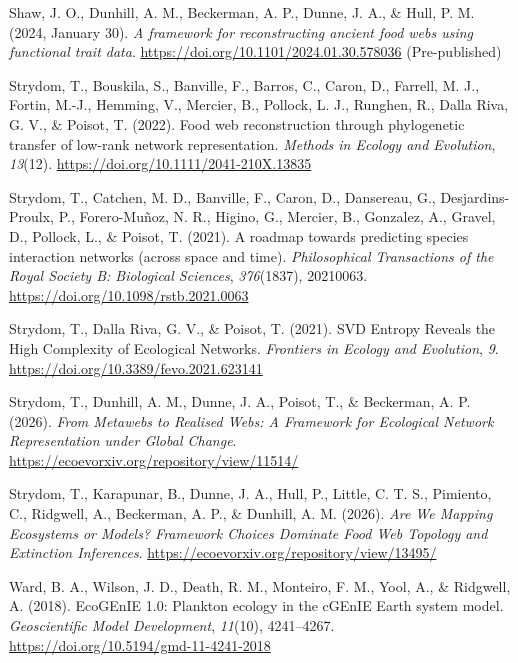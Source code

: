 \documentclass[
]{article}
\newlength{\cslhangindent}
\newenvironment{CSLReferences}[2] %
 {\begin{list}{}{%
  \setlength{\itemindent}{0pt}
  \setlength{\leftmargin}{0pt}
  \setlength{\parsep}{0pt}
  \ifodd #1
   \setlength{\leftmargin}{\cslhangindent}
   \setlength{\itemindent}{-1\cslhangindent}
  \fi
  \setlength{\itemsep}{#2\baselineskip}}}
 {\end{list}}
\begin{document}
\begin{CSLReferences}{1}{0}
Shaw, J. O., Dunhill, A. M., Beckerman, A. P., Dunne, J. A., \& Hull, P.
M. (2024, January 30). \emph{A framework for reconstructing ancient food
webs using functional trait data}.
\url{https://doi.org/10.1101/2024.01.30.578036} (Pre-published)

Strydom, T., Bouskila, S., Banville, F., Barros, C., Caron, D., Farrell,
M. J., Fortin, M.-J., Hemming, V., Mercier, B., Pollock, L. J., Runghen,
R., Dalla Riva, G. V., \& Poisot, T. (2022). Food web reconstruction
through phylogenetic transfer of low-rank network representation.
\emph{Methods in Ecology and Evolution}, \emph{13}(12).
\url{https://doi.org/10.1111/2041-210X.13835}

Strydom, T., Catchen, M. D., Banville, F., Caron, D., Dansereau, G.,
Desjardins-Proulx, P., Forero-Muñoz, N. R., Higino, G., Mercier, B.,
Gonzalez, A., Gravel, D., Pollock, L., \& Poisot, T. (2021). A roadmap
towards predicting species interaction networks (across space and time).
\emph{Philosophical Transactions of the Royal Society B: Biological
Sciences}, \emph{376}(1837), 20210063.
\url{https://doi.org/10.1098/rstb.2021.0063}

Strydom, T., Dalla Riva, G. V., \& Poisot, T. (2021). {SVD Entropy
Reveals} the {High Complexity} of {Ecological Networks}. \emph{Frontiers
in Ecology and Evolution}, \emph{9}.
\url{https://doi.org/10.3389/fevo.2021.623141}

Strydom, T., Dunhill, A. M., Dunne, J. A., Poisot, T., \& Beckerman, A.
P. (2026). \emph{From {Metawebs} to {Realised Webs}: {A Framework} for
{Ecological Network Representation} under {Global Change}}.
\url{https://ecoevorxiv.org/repository/view/11514/}

Strydom, T., Karapunar, B., Dunne, J. A., Hull, P., Little, C. T. S.,
Pimiento, C., Ridgwell, A., Beckerman, A. P., \& Dunhill, A. M. (2026).
\emph{Are {We Mapping Ecosystems} or {Models}? {Framework Choices
Dominate Food Web Topology} and {Extinction Inferences}}.
\url{https://ecoevorxiv.org/repository/view/13495/}

Ward, B. A., Wilson, J. D., Death, R. M., Monteiro, F. M., Yool, A., \&
Ridgwell, A. (2018). {EcoGEnIE} 1.0: Plankton ecology in the {cGEnIE
Earth} system model. \emph{Geoscientific Model Development},
\emph{11}(10), 4241--4267.
\url{https://doi.org/10.5194/gmd-11-4241-2018}


\end{CSLReferences}
\end{document}
